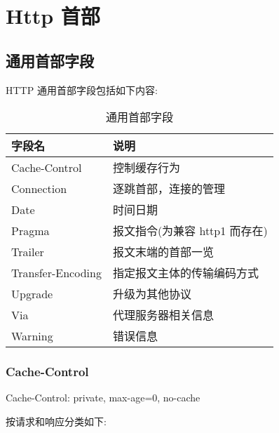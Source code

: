 \section{Http 首部}
\subsection{通用首部字段}

HTTP 通用首部字段包括如下内容:

\begin{table}[H]
    \centering
    \caption{通用首部字段}
    \label{table:通用首部字段}
    \setlength{\tabcolsep}{4mm}
    \begin{tabular}{l|l}
        \toprule
        \textbf{字段名} & \textbf{说明} \\
        \midrule
        Cache-Control & 控制缓存行为 \\
        Connection & 逐跳首部，连接的管理 \\
        Date & 时间日期 \\
        Pragma & 报文指令(为兼容 http1 而存在) \\
        Trailer & 报文末端的首部一览 \\
        Transfer-Encoding & 指定报文主体的传输编码方式 \\
        Upgrade & 升级为其他协议 \\
        Via & 代理服务器相关信息 \\
        Warning & 错误信息 \\
        \bottomrule
    \end{tabular}
\end{table}

\subsubsection{Cache-Control}

\begin{bash}
Cache-Control: private, max-age=0, no-cache
\end{bash}

按请求和响应分类如下:

